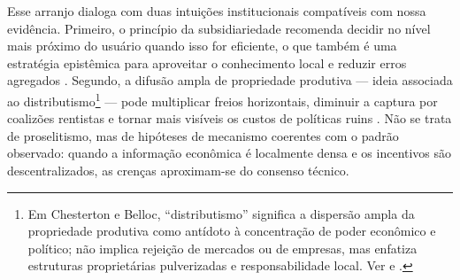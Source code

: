 Esse arranjo dialoga com duas intuições institucionais compatíveis com nossa evidência. Primeiro, o princípio da subsidiariedade recomenda decidir no nível mais próximo do usuário quando isso for eficiente, o que também é uma estratégia epistêmica para aproveitar o conhecimento local e reduzir erros agregados \cite{hayek_knowledge_use,pcjp2004compendio,pioxi1931quadragesimo}. Segundo, a difusão ampla de propriedade produtiva — ideia associada ao distributismo\footnote{Em Chesterton e Belloc, “distributismo” significa a dispersão ampla da propriedade produtiva como antídoto à concentração de poder econômico e político; não implica rejeição de mercados ou de empresas, mas enfatiza estruturas proprietárias pulverizadas e responsabilidade local. Ver  e .} — pode multiplicar freios horizontais, diminuir a captura por coalizões rentistas e tornar mais visíveis os custos de políticas ruins \cite{chesterton1926outline,belloc1912servile}.
 Não se trata de proselitismo, mas de hipóteses de mecanismo coerentes com o padrão observado: quando a informação econômica é localmente densa e os incentivos são descentralizados, as crenças aproximam-se do consenso técnico.

